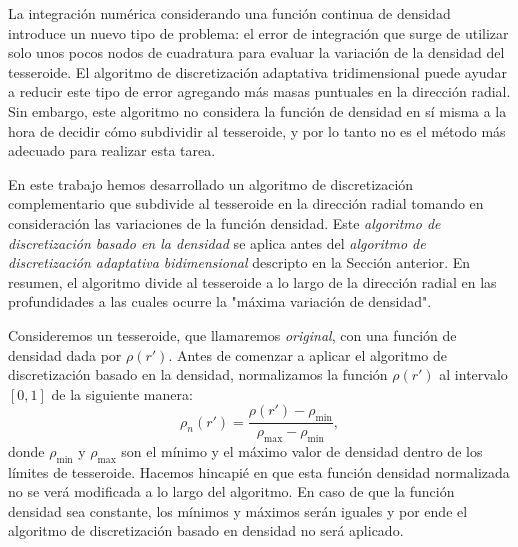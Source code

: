 La integración numérica considerando una función continua de densidad introduce
un nuevo tipo de problema: el error de integración que surge de utilizar solo
unos pocos nodos de cuadratura para evaluar la variación de la densidad del
tesseroide.
El algoritmo de discretización adaptativa tridimensional puede ayudar a reducir
este tipo de error agregando más masas puntuales en la dirección radial.
Sin embargo, este algoritmo no considera la función de densidad en sí misma
a la hora de decidir cómo subdividir al tesseroide, y por lo tanto no es el
método más adecuado para realizar esta tarea.

En este trabajo hemos desarrollado un algoritmo de discretización
complementario que subdivide al tesseroide en la dirección radial tomando en
consideración las variaciones de la función densidad.
Este \emph{algoritmo de discretización basado en la densidad} se aplica antes
del \emph{algoritmo de discretización adaptativa bidimensional} descripto en la
Sección anterior.
En resumen, el algoritmo divide al tesseroide a lo largo de la dirección radial
en las profundidades a las cuales ocurre la "máxima variación de densidad".

Consideremos un tesseroide, que llamaremos \emph{original}, con una función de
densidad dada por $\rho(r')$.
Antes de comenzar a aplicar el algoritmo de discretización basado en la
densidad, normalizamos la función $\rho(r')$ al intervalo $[0, 1]$ de la
siguiente manera:
%
\begin{equation}
    \rho_n(r') =
    \frac{\rho(r') - \rho_\text{min}}{\rho_\text{max} - \rho_\text{min}},
\end{equation}
%
donde $\rho_\text{min}$ y $\rho_\text{max}$ son el mínimo y el máximo
valor de densidad dentro de los límites de tesseroide.
Hacemos hincapié en que esta función densidad normalizada no se verá modificada
a lo largo del algoritmo.
En caso de que la función densidad sea constante, los mínimos y máximos serán
iguales y por ende el algoritmo de discretización basado en densidad no será
aplicado.

